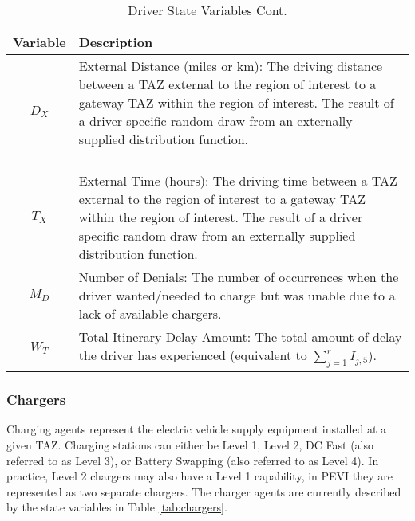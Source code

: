 \documentclass[journal]{IEEEtran}
\begin{document}
\begin{table}[!h]
\def\colmargin{6.75cm}
\renewcommand{\arraystretch}{1.3}
\caption{Driver State Variables Cont.}
\label{tab:drivers2}
\centering
\begin{tabular}{|cl|}
\hline
Variable & Description\\
\hline
$D_X$ & \parbox[t]{\colmargin}{ \raggedright External Distance (miles or km): The driving distance between a TAZ external to the region of interest to a gateway TAZ within the region of interest. The result of a driver specific random draw from an externally supplied distribution function.\\~ }\\
$T_X$ & \parbox[t]{\colmargin}{ \raggedright External Time (hours): The driving time between a TAZ external to the region of interest to a gateway TAZ within the region of interest. The result of a driver specific random draw from an externally supplied distribution function.}\\
$M_D$ & \parbox[t]{\colmargin}{ \raggedright Number of Denials: The number of occurrences when the driver wanted/needed to charge but was unable due to a lack of available chargers.}\\
$W_T$ & \parbox[t]{\colmargin}{ \raggedright Total Itinerary Delay Amount: The total amount of delay the driver has experienced (equivalent to $\sum_{j=1}^r I_{j,5}$). }\\
\hline
\end{tabular}
\end{table}

\subsubsection{Chargers}

Charging agents represent the electric vehicle supply equipment installed at a given TAZ.  Charging stations can either be Level 1, Level 2, DC Fast (also referred to as Level 3), or Battery Swapping (also referred to as Level 4).  In practice, Level 2 chargers may also have a Level 1 capability, in PEVI they are represented as two separate chargers.  The charger agents are currently described by the state variables in Table \ref{tab:chargers}.
\end{document}

